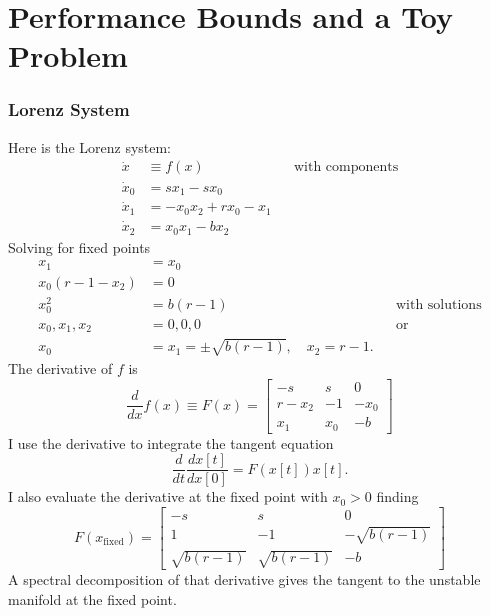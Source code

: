 \documentclass[prelim,showlabels]{book}
\begin{document}
\chapter[Performance Bounds]{Performance Bounds and a Toy Problem}
\label{chap:toys}

\subsection{Lorenz System}
\label{sec:lorenz_system}

Here is the Lorenz system:
\begin{align*}
  \dot x &\equiv f(x) && \text{with components} \\
  \dot x_0 &= s x_1 - s x_0 \\
  \dot x_1 &= -x_0 x_2 + r x_0 - x_1 \\
  \dot x_2 &= x_0 x_1 - b x_2
\end{align*}
Solving for fixed points
\begin{align*}
  x_1 &= x_0 \\
  x_0(r-1-x_2) &=0 \\
  x_0^2 &= b(r-1) &&\text{with solutions}\\
  x_0, x_1, x_2 &= 0,0,0 &&\text{or}\\
  x_0 &= x_1 = \pm \sqrt{b(r-1)}, \quad x_2 = r-1.
\end{align*}
The derivative of $f$ is
\begin{equation*}
  \frac{d}{dx} f(x) \equiv F(x) = 
  \begin{bmatrix}
    -s    & s   & 0 \\
    r-x_2 & -1  & -x_0 \\
    x_1   & x_0 & -b
  \end{bmatrix}
\end{equation*}
I use the derivative to integrate the tangent equation
\begin{equation*}
  \frac{d}{dt} \frac{d x[t]}{d x[0]} = F(x[t]) x[t].
\end{equation*}
I also evaluate the derivative at the fixed point with $x_0>0$ finding
\begin{equation*}
  F(x_{\text{fixed}}) =
  \begin{bmatrix}
    -s            &   s           & 0 \\
    1             &  -1           & -\sqrt{b(r-1)} \\
    \sqrt{b(r-1)} & \sqrt{b(r-1)} & -b
  \end{bmatrix}
\end{equation*}
A spectral decomposition of that derivative gives the tangent to the
unstable manifold at the fixed point.
\end{document}
